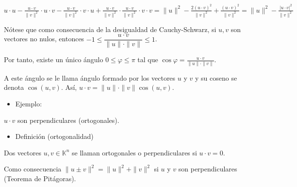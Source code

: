 \documentclass[12pt]{article}
\begin{document}
$u\cdot u-\frac{u\cdot v}{\|v\|^2}\cdot u\cdot v-\frac{u\cdot
v}{\|v\|^2}\cdot v\cdot u+\frac{u\cdot
v}{\|v\|^2}\cdot\frac{u\cdot v}{\|v\|^2}\cdot v\cdot
v=\|u\|^2-\frac{2(u\cdot v)^2}{\|v\|^2}+\frac{(u\cdot
v)^2}{\|v\|^2}=\|u\|^2-\frac{|u\cdot v|^2}{\|v\|^2}$

Nótese que como consecuencia de la desigualdad de
Cauchy-Schwarz, si $u,v$ son vectores no nulos, entonces
$-1\le\dfrac{u\cdot v}{\|u\|\cdot\|v\|}\le1$.

Por tanto, existe un único ángulo $0\le\varphi\le\pi$ tal que
$\cos\varphi=\frac{u\cdot v}{\|u\|\cdot\|v\|}$.

A este ángulo se le llama ángulo formado por los vectores $u$ y
$v$ y su coseno se denota $\cos(u,v)$. Así, $u\cdot
v=\|u\|\cdot\|v\|\cos(u,v)$.
\begin{itemize}[label=\color{red}\textbullet, leftmargin=*]
    \item \color{lightblue} Ejemplo:
\end{itemize}

$u\cdot v$ son perpendiculares (ortogonales).
\begin{itemize}[label=\color{red}\textbullet, leftmargin=*]
    \item \color{lightblue} Definición (ortogonalidad)
\end{itemize}
Dos vectores $u,v\in\mathbb{K}^n$ se llaman ortogonales o
perpendiculares si $u\cdot v=0$.

Como consecuencia $\|u\pm v\|^2=\|u\|^2+\|v\|^2$ si $u$ y $v$
son perpendiculares (Teorema de Pitágoras).
\end{document}
